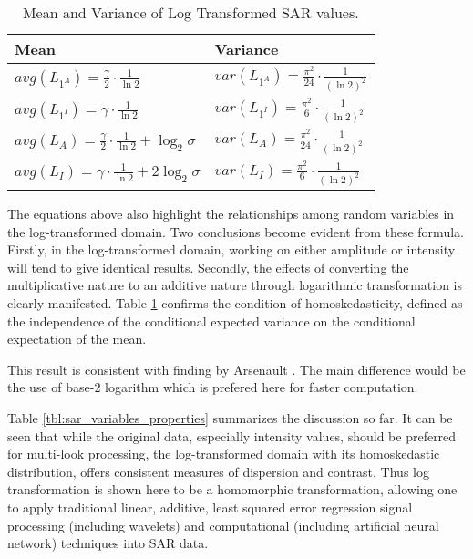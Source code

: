\documentclass[journal]{IEEEtran}
\begin{document}
\begin{table}[!h]
\caption{ Mean and Variance of Log Transformed SAR values. }
\label{tbl:sar_log_domain_avg_var}
\normalsize
\centering

\begin{tabular}{|l|l|}
\hline
Mean & Variance \\
\hline
$avg(L_{1^A}) = \frac{ \gamma }{2} \cdot \frac{1}{\ln2}$ & $var(L_{1^A}) = \frac{ \pi ^2}{24} \cdot \frac{1}{(\ln2)^2}$ \\
$avg(L_{1^I}) = \gamma \cdot \frac{1}{\ln2} $ & $var(L_{1^I}) = \frac{ \pi ^2}{6} \cdot \frac{1}{(\ln2)^2} $ \\
$avg(L_A) = \frac{ \gamma }{2} \cdot \frac{1}{\ln2} + \log_2{\sigma}$ & $var(L_A) = \frac{ \pi ^2}{24} \cdot \frac{1}{(\ln2)^2}$ \\
$avg(L_I) = \gamma \cdot \frac{1}{\ln2} + 2 \log_2{\sigma}  $ & $ var(L_I) = \frac{ \pi ^2}{6} \cdot \frac{1}{(\ln2)^2}$ \\
\hline
\end{tabular}

\end{table}

The equations above also highlight the relationships among random variables in the log-transformed domain. 
Two conclusions become evident from these formula. 
Firstly, in the log-transformed domain, working on either amplitude or intensity will tend to give identical results. 
Secondly, the effects of converting the multiplicative nature to an additive nature through logarithmic transformation is clearly manifested. 
Table \ref{tbl:sar_log_domain_avg_var} confirms the condition of homoskedasticity,  defined as the independence of the conditional expected variance on the conditional expectation of the mean. 

This result is consistent with finding by Arsenault \cite{Arsenault_JOptSocAm_1976}. The main difference would be the use of base-2 logarithm which is prefered here for faster computation. 

Table \ref{tbl:sar_variables_properties} summarizes the discussion so far. 
It can be seen that while the original data, especially intensity values, should be preferred for multi-look processing, the log-transformed domain with its homoskedastic distribution, offers consistent measures of dispersion and contrast. 
Thus log transformation is shown here to be a homomorphic transformation, allowing one to apply traditional linear, additive, least squared error regression signal processing (including wavelets) and computational (including artificial neural network) techniques into SAR data.
\end{document}

